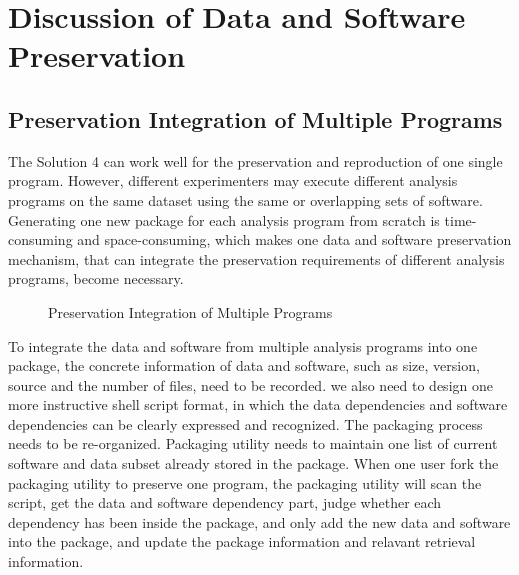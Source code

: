 \documentclass{acm_proc_article-sp}
\begin{document}
\section{Discussion of Data and Software Preservation}
\subsection{Preservation Integration of Multiple Programs}
The Solution 4 can work well for the preservation and reproduction of one single program. However, different experimenters may execute different analysis programs on the same dataset using the same or overlapping sets of software. Generating one new package for each analysis program from scratch is time-consuming and space-consuming, which makes one data and software preservation mechanism, that can integrate the preservation requirements of different analysis programs, become necessary. 

\begin{figure}
\centering
{}
\caption{Preservation Integration of Multiple Programs}
\label{fig:Preservation integration}
\end{figure}

To integrate the data and software from multiple analysis programs into one
package, the concrete information of data and software, such as size, version,
source and the number of files, need to be recorded. we also need to design one
more instructive shell script format, in which the data dependencies and
software dependencies can be clearly expressed and recognized. The packaging
process needs to be re-organized. Packaging utility needs to maintain one list
of current software and data subset already stored in the package. When one
user fork the packaging utility to preserve one program, the
packaging utility will scan the script, get the data and software dependency
part, judge whether each dependency has been inside the package, and only add
the new data and software into the package, and update the package information
and relavant retrieval information.
\end{document}
